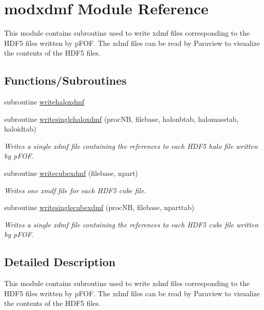 \hypertarget{namespacemodxdmf}{}\section{modxdmf Module Reference}
\label{namespacemodxdmf}


This module contains subroutine used to write xdmf files corresponding to the H\+D\+F5 files written by p\+F\+OF. The xdmf files can be read by Paraview to visualize the contents of the H\+D\+F5 files.  


\subsection*{Functions/\+Subroutines}
\begin{DoxyCompactItemize}
\item 
subroutine \hyperlink{namespacemodxdmf_ae2f7d2597902a070b71c0f7e57a1fd94}{writehaloxdmf}
\item 
subroutine \hyperlink{namespacemodxdmf_ab794d1f6abf632c9ff4279bec51e13b1}{writesinglehaloxdmf} (proc\+NB, filebase, halonbtab, halomasstab, haloidtab)
\begin{DoxyCompactList}\small\item\em Writes a single xdmf file containing the references to each H\+D\+F5 halo file written by p\+F\+OF. \end{DoxyCompactList}\item 
subroutine \hyperlink{namespacemodxdmf_a72e8949508c9724a4993f8f43447a1ea}{writecubexdmf} (filebase, npart)
\begin{DoxyCompactList}\small\item\em Writes one xmdf file for each H\+D\+F5 cube file. \end{DoxyCompactList}\item 
subroutine \hyperlink{namespacemodxdmf_ae843cb42b7f4598f934c91195facf470}{writesinglecubexdmf} (proc\+NB, filebase, nparttab)
\begin{DoxyCompactList}\small\item\em Writes a single xdmf file containing the references to each H\+D\+F5 cube file written by p\+F\+OF. \end{DoxyCompactList}\end{DoxyCompactItemize}


\subsection{Detailed Description}
This module contains subroutine used to write xdmf files corresponding to the H\+D\+F5 files written by p\+F\+OF. The xdmf files can be read by Paraview to visualize the contents of the H\+D\+F5 files. 

